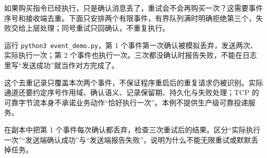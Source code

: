 \begin{example}
如果购买指令已经执行，只是确认消息丢了，重试会不会再购买一次？这需要事件序号和接收端去重。下面只安排两个有限事件，有界队列满时明确拒绝第三个，失败交给上层处理；同号重试只回确认，不重复执行。
\begin{commcode}

\end{commcode}
运行 \texttt{python3 event\_demo.py}，第 1 个事件第一次确认被模拟丢弃，发送两次、实际执行一次；第 2 个事件也执行一次。三次都没确认时报告失败，不能在日志里写“发送成功”就当作对方完成了。
\begin{note}
这个去重记录只覆盖本次两个事件，不保证程序重启后的重复请求仍被识别。实际通道还要约定序号作用域、确认语义、记录保留期、持久化与失败处理；TCP 的可靠字节流本身不承诺业务动作“恰好执行一次”。本例不提供生产级可靠投递服务。
\end{note}
\end{example}
\begin{exercise}\label{ex:v2-comm-events}
在副本中把第 1 个事件每次确认都丢弃，检查三次重试后的结果。区分“实际执行一次”“发送端确认成功”与“发送端报告失败”，说明为什么不能无限重试或默默丢掉任务。
\end{exercise}

